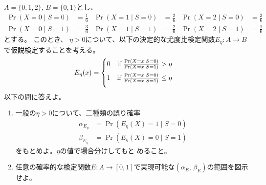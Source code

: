 \documentclass[lualatex,ja=standard,a4paper]{bxjsarticle}
\theoremstyle{definition}
\theoremstyle{remark}
\begin{document}
\vspace{1em}
$A=\{0,1,2\},\,B=\{0, 1\}$とし、
\begin{align*}
\Pr(X = 0 \mid S = 0) &= \frac16&
\Pr(X = 1 \mid S = 0) &= \frac26&
\Pr(X = 2 \mid S = 0) &= \frac36\\
\Pr(X = 0 \mid S = 1) &= \frac36&
\Pr(X = 1 \mid S = 1) &= \frac26&
\Pr(X = 2 \mid S = 1) &= \frac16
\end{align*}
とする。
このとき、 $\eta> 0$について、以下の決定的な尤度比検定関数$E_\eta\colon A\to B$で仮説検定することを考える。
\begin{align*}
E_\eta(x)&=
\begin{cases}
\vspace{.5em}
0&\text{if } \frac{\Pr(X = x\mid S = 0)}{\Pr(X = x\mid S = 1)} > \eta\\\vspace{.5em}
1&\text{if } \frac{\Pr(X = x\mid S = 0)}{\Pr(X = x\mid S = 1)} \le \eta
\end{cases}
\end{align*}
以下の問に答えよ。
\begin{enumerate}
\setlength{\itemsep}{1em}
\item 一般の$\eta>0$について、二種類の誤り確率
\begin{align*}
\alpha_{E_\eta}&=\Pr(E_\eta(X)=1\mid S=0)\\
\beta_{E_\eta}&=\Pr(E_\eta(X)=0\mid S=1)
\end{align*}
をもとめよ。$\eta$の値で場合分けしてもと
めること。
\item 任意の確率的な検定関数$E\colon A\to[0,1]$で実現可能な$(\alpha_E,\, \beta_E)$の範囲を図示せよ。
\end{enumerate}
\end{document}
